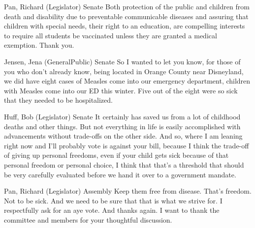 \begin{result}{8.830523154233383}{Pan, Richard (Legislator) Senate}
Both protection of the public and children from death and disability due to preventable communicable diseases and assuring that children with special needs, their right to an education, are compelling interests to require all students be vaccinated unless they are granted a medical exemption. Thank you.
\end{result}

\begin{result}{8.67213374776659}{Jensen, Jena (GeneralPublic) Senate}
So I wanted to let you know, for those of you who don't already know, being located in Orange County near Disneyland, we did have eight cases of Measles come into our emergency department, children with Measles come into our ED this winter. Five out of the eight were so sick that they needed to be hospitalized.
\end{result}

\begin{result}{8.587621734089648}{Huff, Bob (Legislator) Senate}
It certainly has saved us from a lot of childhood deaths and other things. But not everything in life is easily accomplished with advancements without trade-offs on the other side. And so, where I am leaning right now and I'll probably vote is against your bill, because I think the trade-off of giving up personal freedoms, even if your child gets sick because of that personal freedom or personal choice, I think that that's a threshold that should be very carefully evaluated before we hand it over to a government mandate.
\end{result}

\begin{result}{8.02002802077853}{Pan, Richard (Legislator) Assembly}
Keep them free from disease. That's freedom. Not to be sick. And we need to be sure that that is what we strive for. I respectfully ask for an aye vote. And thanks again. I want to thank the committee and members for your thoughtful discussion.
\end{result}

